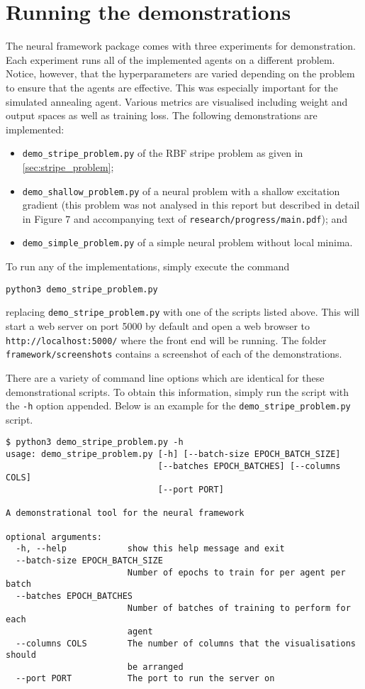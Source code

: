 \section{Running the demonstrations}
\label{sec:neural_surfer_demos}
The neural framework package comes with three experiments for demonstration.
Each experiment runs all of the implemented agents on a different problem.
Notice, however, that the hyperparameters are varied depending on the problem to ensure that the agents are effective.
This was especially important for the simulated annealing agent.
Various metrics are visualised including weight and output spaces as well as training loss.
The following demonstrations are implemented:
\begin{itemize}
    \item \texttt{demo\_stripe\_problem.py} of the RBF stripe problem as given in \ref{sec:stripe_problem};
    \item \texttt{demo\_shallow\_problem.py} of a neural problem with a shallow excitation gradient (this problem was not analysed in this report but described in detail in Figure 7 and accompanying text of \texttt{research/progress/main.pdf}); and
    \item \texttt{demo\_simple\_problem.py} of a simple neural problem without local minima.
\end{itemize}

To run any of the implementations, simply execute the command
\begin{verbatim}
python3 demo_stripe_problem.py
\end{verbatim}
replacing \texttt{demo\_stripe\_problem.py} with one of the scripts listed above.
This will start a web server on port 5000 by default and open a web browser to \texttt{http://localhost:5000/} where the front end will be running.
The folder \texttt{framework/screenshots} contains a screenshot of each of the demonstrations.

There are a variety of command line options which are identical for these demonstrational scripts.
To obtain this information, simply run the script with the \texttt{-h} option appended.
Below is an example for the \texttt{demo\_stripe\_problem.py} script.
\begin{verbatim}
$ python3 demo_stripe_problem.py -h
usage: demo_stripe_problem.py [-h] [--batch-size EPOCH_BATCH_SIZE]
                              [--batches EPOCH_BATCHES] [--columns COLS]
                              [--port PORT]

A demonstrational tool for the neural framework

optional arguments:
  -h, --help            show this help message and exit
  --batch-size EPOCH_BATCH_SIZE
                        Number of epochs to train for per agent per batch
  --batches EPOCH_BATCHES
                        Number of batches of training to perform for each
                        agent
  --columns COLS        The number of columns that the visualisations should
                        be arranged
  --port PORT           The port to run the server on
\end{verbatim}


